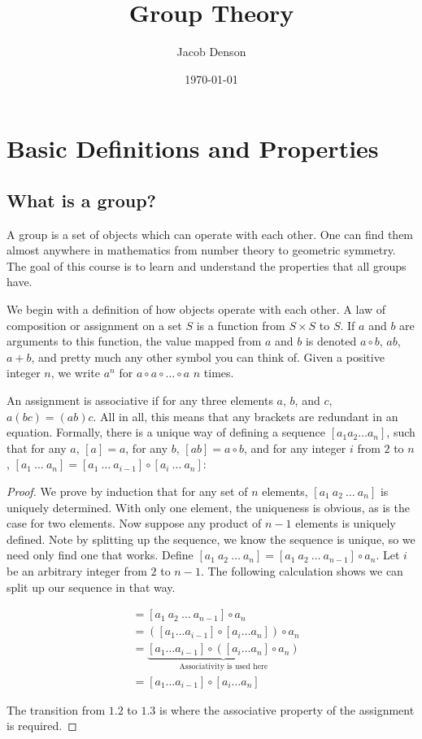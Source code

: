 \documentclass{report}
\title{Group Theory}
\author{Jacob Denson}
\date{\today}
\begin{document}
\maketitle

\chapter{Basic Definitions and Properties}

\section{What is a group?}

A group is a set of objects which can operate with each other. One can find them almost anywhere in mathematics from number theory to geometric symmetry. The goal of this course is to learn and understand the properties that all groups have.

We begin with a definition of how objects operate with each other. A law of composition or assignment on a set $S$ is a function from $S \times S$ to $S$. If $a$ and $b$ are arguments to this function, the value mapped from $a$ and $b$ is denoted $a \circ b$, $ab$, $a + b$, and pretty much any other symbol you can think of. Given a positive integer $n$, we write $a^n$ for $a \circ a \circ \dots \circ a$ $n$ times.

An assignment is associative if for any three elements $a$, $b$, and $c$, $a(bc) = (ab)c$. All in all, this means that any brackets are redundant in an equation. Formally, there is a unique way of defining a sequence $[a_1 a_2 \dots a_n]$, such that for any $a$, $[a] = a$, for any $b$, $[ab] = a \circ b$, and for any integer $i$ from $2$ to $n$, $[a_1\ \dots\ a_n] = [a_1\ \dots\ a_{i-1}] \circ [a_i\ \dots\ a_n]$:
\begin{proof}
    We prove by induction that for any set of $n$ elements, $[a_1\ a_2\ \dots\ a_n]$ is uniquely determined. With only one element, the uniqueness is obvious, as is the case for two elements. Now suppose any product of $n-1$ elements is uniquely defined. Note by splitting up the sequence, we know the sequence is unique, so we need only find one that works. Define $[a_1\ a_2\ \dots\ a_n] = [a_1\ a_2\ \dots\ a_{n-1}] \circ a_n$. Let $i$ be an arbitrary integer from $2$ to $n-1$. The following calculation shows we can split up our sequence in that way.

    \begin{align*}
    [a_1\ a_2\ \dots\ a_n] &= [a_1\ a_2\ \dots\ a_{n-1}] \circ a_n\\
    &= ([a_1 \dots a_{i-1}] \circ [a_i \dots a_n]) \circ a_n\\
    &= \underbrace{[a_1 \dots a_{i-1}] \circ ([a_i \dots a_n] \circ a_n)}_\text{Associativity is used here}\\
    &= [a_1 \dots a_{i-1}] \circ [a_i \dots a_n]
    \end{align*}

    The transition from $1.2$ to $1.3$ is where the associative property of the assignment is required.
\end{proof}
\end{document}
